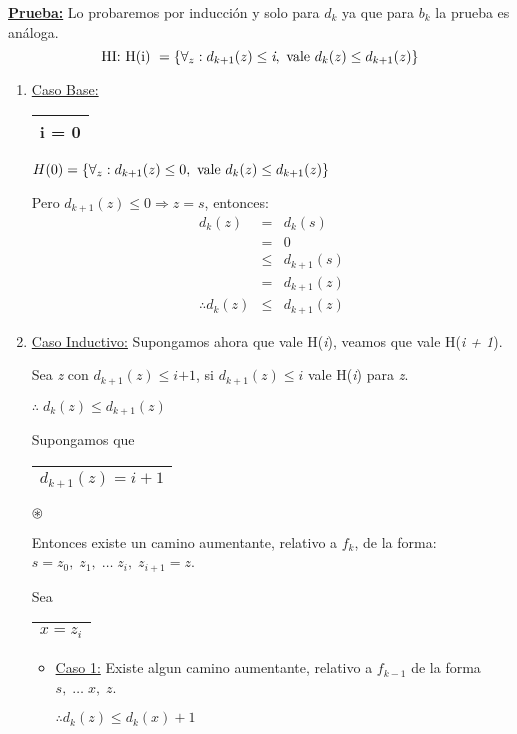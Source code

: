 \documentclass[12pt,a4paper]{report}
\begin{document}
		\textbf{\underline{Prueba:}} Lo probaremos por inducción y solo para $d_{k}$ ya que para $b_{k}$ la prueba es análoga.
			\[ \textup{HI: H(i) } = \lbrace\forall_{z}: d_{k + 1}(z) \leq \textit{i}, \textup{ vale } d_{k}(z) \leq d_{k + 1}(z)\rbrace \]

			\begin{enumerate}
				\item \underline{Caso Base:} \begin{tabular}{|c|} \hline i = 0 \\\hline \end{tabular} \qquad $H(0) = \lbrace\forall_{z}: d_{k + 1}(z) \leq 0, \textup{ vale } d_{k}(z) \leq d_{k + 1}(z)  \rbrace$
					\par Pero $d_{k + 1}(z) \leq 0 \Rightarrow z = \textit{s}$, entonces:
					\begin{eqnarray}
						\nonumber d_{k}(z) &=& d_{k}(s) \\
						\nonumber &=& 0 \\
						\nonumber &\leq & d_{k + 1}(s) \\
						\nonumber &=& d_{k + 1}(z) \\
						\nonumber \therefore d_{k}(z) & \leq & d_{k + 1}(z)
					\end{eqnarray}
				\item \underline{Caso Inductivo:} Supongamos ahora que vale H(\textit{i}), veamos que vale H(\textit{i + 1}).
					\par Sea \textit{z} con $d_{k + 1}(z) \leq \textit{i+1}$, si $d_{k + 1}(z) \leq \textit{i}$ vale H(\textit{i}) para \textit{z}.
					\par \begin{center} $\therefore \; d_{k}(z) \leq d_{k + 1}(z) $ \end{center}
					\par Supongamos que \begin{tabular}{|c|} \hline $d_{k + 1}(z) = i + 1$ \\\hline \end{tabular} $\circledast$
					\par Entonces existe un camino aumentante, relativo a $f_{k}$, de la forma: $s = z_{0}, \; z_{1}, \; \dotsc \; z_{i}, \; z_{i + 1} = z$.
					\par Sea \begin{tabular}{|c|} \hline $x = z_{i}$ \\ \hline \end{tabular}

					\begin{itemize}
						\item \underline{Caso 1:} Existe algun camino aumentante, relativo a $f_{k - 1}$ de la forma $s, \; \dotsc \; x, \; z$.
							\begin{center}
								$\therefore d_{k}(z) \leq d_{k}(x) + 1$
							\end{center}


\end{itemize}
\end{enumerate}
\end{document}
